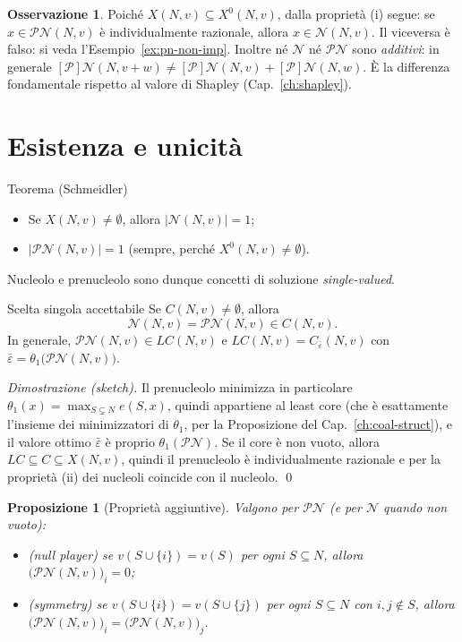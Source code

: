 \documentclass[12pt,a4paper,twoside]{book}
\theoremstyle{plain}
\newtheorem{proposition}[theorem]{Proposizione}
\theoremstyle{definition}
\newtheorem{remark}[theorem]{Osservazione}
\begin{document}
\begin{remark}
Poiché $X(N,v)\subseteq X^{0}(N,v)$, dalla proprietà (i) segue: se
$x\in\mathcal{PN}(N,v)$ è individualmente razionale, allora
$x\in\mathcal{N}(N,v)$. Il viceversa è falso: si veda l'Esempio~\ref{ex:pn-non-imp}.
Inoltre né $\mathcal{N}$ né $\mathcal{PN}$ sono \emph{additivi}:
in generale
$[\mathcal{P}]\mathcal{N}(N,v+w)\ne[\mathcal{P}]\mathcal{N}(N,v)+[\mathcal{P}]\mathcal{N}(N,w)$.
È la differenza fondamentale rispetto al valore di Shapley (Cap.~\ref{ch:shapley}).
\end{remark}

\section{Esistenza e unicità}

\begin{thmbox}{Teorema (Schmeidler)}
\begin{itemize}
  \item[(i)] Se $X(N,v)\ne\emptyset$, allora $|\mathcal{N}(N,v)|=1$;
  \item[(ii)] $|\mathcal{PN}(N,v)|=1$ (sempre, perché $X^{0}(N,v)\ne\emptyset$).
\end{itemize}
Nucleolo e prenucleolo sono dunque concetti di soluzione \emph{single-valued}.
\end{thmbox}

\begin{thmbox}{Scelta singola accettabile}
Se $C(N,v)\ne\emptyset$, allora
\[
  \mathcal{N}(N,v)=\mathcal{PN}(N,v)\in C(N,v).
\]
In generale, $\mathcal{PN}(N,v)\in LC(N,v)$ e $LC(N,v)=C_{\bar\varepsilon}(N,v)$ con
$\bar\varepsilon=\theta_1\bigl(\mathcal{PN}(N,v)\bigr)$.
\end{thmbox}

\textit{Dimostrazione (sketch).} Il prenucleolo minimizza in particolare
$\theta_1(x)=\max_{S\subsetneq N}e(S,x)$, quindi appartiene al least core (che è
esattamente l'insieme dei minimizzatori di $\theta_1$, per la Proposizione del
Cap.~\ref{ch:coal-struct}), e il valore ottimo $\bar\varepsilon$ è proprio
$\theta_1(\mathcal{PN})$. Se il core è non vuoto, allora
$LC\subseteq C\subseteq X(N,v)$, quindi il prenucleolo è individualmente
razionale e per la proprietà (ii) dei nucleoli coincide con il nucleolo. \qed

\begin{proposition}[Proprietà aggiuntive]
Valgono per $\mathcal{PN}$ (e per $\mathcal{N}$ quando non vuoto):
\begin{itemize}
  \item (\emph{null player}) se $v(S\cup\{i\})=v(S)$ per ogni $S\subseteq N$, allora
        $\bigl(\mathcal{PN}(N,v)\bigr)_i=0$;
  \item (\emph{symmetry}) se $v(S\cup\{i\})=v(S\cup\{j\})$ per ogni $S\subseteq N$ con
        $i,j\notin S$, allora
        $\bigl(\mathcal{PN}(N,v)\bigr)_i=\bigl(\mathcal{PN}(N,v)\bigr)_j$.
\end{itemize}
\end{proposition}
\end{document}
